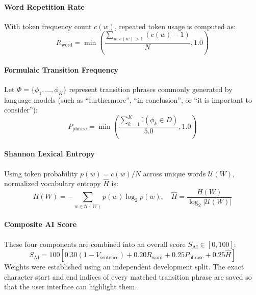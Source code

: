 \documentclass[conference]{IEEEtran}
\begin{document}
\paragraph{Word Repetition Rate}
With token frequency count $c(w)$, repeated token usage is computed as:
\begin{equation}
R_{\text{word}} = \min\left( \frac{\sum_{w: c(w) > 1} (c(w) - 1)}{N}, 1.0 \right)
\end{equation}

\paragraph{Formulaic Transition Frequency}
Let $\Phi = \{\phi_1, \dots, \phi_K\}$ represent transition phrases commonly generated by language models (such as ``furthermore'', ``in conclusion'', or ``it is important to consider''):
\begin{equation}
P_{\text{phrase}} = \min\left( \frac{\sum_{k=1}^K \mathbb{I}(\phi_k \in D)}{5.0}, 1.0 \right)
\end{equation}

\paragraph{Shannon Lexical Entropy}
Using token probability $p(w) = c(w)/N$ across unique words $\mathcal{U}(W)$, normalized vocabulary entropy $\hat{H}$ is:
\begin{equation}
H(W) = -\sum_{w \in \mathcal{U}(W)} p(w) \log_2 p(w), \quad \hat{H} = \frac{H(W)}{\log_2 |\mathcal{U}(W)|}
\end{equation}

\paragraph{Composite AI Score}
These four components are combined into an overall score $S_{\text{AI}} \in [0, 100]$:
\begin{equation}
S_{\text{AI}} = 100 \left[ 0.30(1 - V_{\text{sentence}}) + 0.20 R_{\text{word}} + 0.25 P_{\text{phrase}} + 0.25 \hat{H} \right]
\end{equation}
Weights were established using an independent development split. The exact character start and end indices of every matched transition phrase are saved so that the user interface can highlight them.
\end{document}
